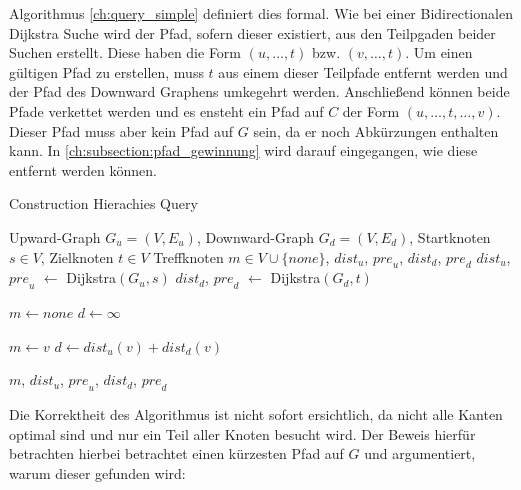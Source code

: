 Algorithmus \ref{ch:query_simple} definiert dies formal.
Wie bei einer Bidirectionalen Dijkstra Suche wird der Pfad, sofern dieser existiert, aus den Teilpgaden beider Suchen erstellt.
Diese haben die Form $(u, \dotsc, t)$ bzw. $(v, \dotsc, t)$.
Um einen gültigen Pfad zu erstellen, muss $t$ aus einem dieser Teilpfade entfernt werden und der Pfad des Downward Graphens umkegehrt werden.
Anschließend können beide Pfade verkettet werden und es ensteht ein Pfad auf $C$ der Form $(u, \dotsc, t, \dotsc, v)$.
Dieser Pfad muss aber kein Pfad auf $G$ sein, da er noch Abkürzungen enthalten kann.
In \autoref{ch:subsection:pfad_gewinnung} wird darauf eingegangen, wie diese entfernt werden können.

\begin{algorithm}[ht]
    \caption{Construction Hierachies Query}
    \begin{algorithmic}[1]
        \Require Upward-Graph $G_u = (V, E_u)$, Downward-Graph $G_d = (V, E_d)$, Startknoten $s \in V$, Zielknoten $t \in V$
        \Ensure Treffknoten $m \in V \cup \{ {none} \}$, ${dist}_u$, ${pre}_u$, ${dist}_d$, ${pre}_d$
        \State ${dist}_u$, ${pre}_u$ $\leftarrow$ Dijkstra$(G_u, s)$
        \State ${dist}_d$, ${pre}_d$ $\leftarrow$ Dijkstra$(G_d, t)$

        \State
        \State $m \leftarrow {none}$
        \State $d \leftarrow \infty$
        \State

        \State $m \leftarrow v$
        \State $d \leftarrow {dist}_u(v) + {dist}_d(v)$
        \EndIf
        \EndFor

        \State
        \State \Return $m$, ${dist}_u$, ${pre}_u$, ${dist}_d$, ${pre}_d$
    \end{algorithmic}
    \label{ch:query_simple}
\end{algorithm}

Die Korrektheit des Algorithmus ist nicht sofort ersichtlich, da nicht alle Kanten optimal sind und nur ein Teil aller Knoten besucht wird.
Der Beweis hierfür betrachten hierbei betrachtet einen kürzesten Pfad auf $G$ und argumentiert, warum dieser gefunden wird:

